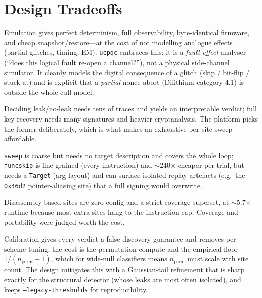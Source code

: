 \documentclass[11pt]{article}
\newcommand{\code}[1]{\texttt{#1}}
\newcommand{\ucpqc}{\code{ucpqc}}
\begin{document}
\section{Design Tradeoffs}\label{sec:tradeoffs}

\begin{description}[leftmargin=0em,style=nextline]
\item[Emulation vs.\ hardware.] Emulation gives perfect determinism, full
observability, byte-identical firmware, and cheap snapshot/restore---at the cost of
not modelling analogue effects (partial glitches, timing, EM). \ucpqc{} embraces
this: it is a \emph{fault-effect} analyser (``does this logical fault re-open a
channel?''), not a physical side-channel simulator. It cleanly models the digital
consequence of a glitch (skip / bit-flip / stuck-at) and is explicit that a
\emph{partial} nonce abort (Dilithium category 4.1) is outside the whole-call model.

\item[Leak-detection vs.\ key recovery.] Deciding leak/no-leak needs tens of
traces and yields an interpretable verdict; full key recovery needs many signatures
and heavier cryptanalysis. The platform picks the former deliberately, which is what
makes an exhaustive per-site sweep affordable.

\item[Whole-call \code{sweep} vs.\ \code{funcskip}.] \code{sweep} is coarse but
needs no target description and covers the whole loop; \code{funcskip} is fine-grained
(every instruction) and $\sim$240$\times$ cheaper per trial, but needs a
\code{Target} (arg layout) and can surface isolated-replay artefacts (e.g.\ the
\code{0x46d2} pointer-aliasing site) that a full signing would overwrite.

\item[Auto-discovery vs.\ curated sites.] Disassembly-based sites are zero-config and
a strict coverage superset, at $\sim$5.7$\times$ runtime because most extra sites
hang to the instruction cap. Coverage and portability were judged worth the cost.

\item[Calibrated $p$-values vs.\ fixed thresholds.] Calibration gives every verdict a
false-discovery guarantee and removes per-scheme tuning; the cost is the permutation
compute and the empirical floor $1/(n_{\text{perm}}+1)$, which for wide-null
classifiers means $n_{\text{perm}}$ must scale with site count. The design mitigates
this with a Gaussian-tail refinement that is sharp exactly for the structural
detector (whose leaks are most often isolated), and keeps \code{--legacy-thresholds}
for reproducibility.


\end{description}
\end{document}
